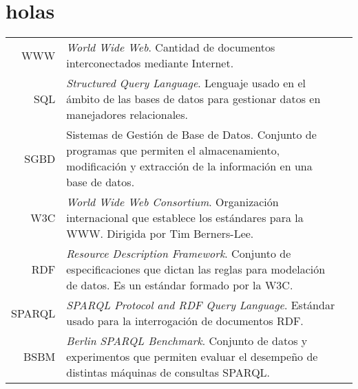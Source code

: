 \chapter{holas}
\begin{tabular}{r p{13cm}l }
    WWW & \emph{World Wide Web}. Cantidad de documentos interconectados mediante Internet.\\

    SQL & \emph{Structured Query Language}. Lenguaje usado en el ámbito de las bases de datos para gestionar datos en manejadores relacionales.\\

    SGBD & Sistemas de Gestión de Base de Datos. Conjunto de programas que permiten el almacenamiento, modificación y extracción de la información en una base de datos.\\

    W3C & \emph{World Wide Web Consortium}. Organización internacional que establece los estándares para la WWW. Dirigida por Tim Berners-Lee.\\

    RDF & \emph{Resource Description Framework}. Conjunto de especificaciones que dictan las reglas para modelación de datos. Es un estándar formado por la W3C.\\

    SPARQL & \emph{SPARQL Protocol and RDF Query Language}. Estándar usado para la interrogación de documentos RDF.\\
    
    BSBM & \emph{Berlin SPARQL Benchmark}. Conjunto de datos y experimentos que permiten evaluar el desempeño de distintas máquinas de consultas SPARQL.\\
\end{tabular}
